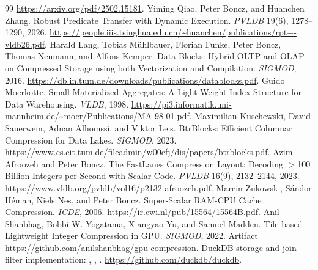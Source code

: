 \begin{thebibliography}{99}
\url{https://arxiv.org/pdf/2502.15181}.
 Yiming Qiao, Peter Boncz, and Huanchen Zhang.
Robust Predicate Transfer with Dynamic Execution.
\emph{PVLDB} 19(6), 1278--1290, 2026.
\url{https://people.iiis.tsinghua.edu.cn/~huanchen/publications/rpt+-vldb26.pdf}.
 Harald Lang, Tobias M\"uhlbauer, Florian Funke,
Peter Boncz, Thomas Neumann, and Alfons Kemper.
Data Blocks: Hybrid OLTP and OLAP on Compressed Storage using both
Vectorization and Compilation. \emph{SIGMOD}, 2016.
\url{https://db.in.tum.de/downloads/publications/datablocks.pdf}.
 Guido Moerkotte.
Small Materialized Aggregates: A Light Weight Index Structure for Data
Warehousing. \emph{VLDB}, 1998.
\url{https://pi3.informatik.uni-mannheim.de/~moer/Publications/MA-98-01.pdf}.
 Maximilian Kuschewski, David Sauerwein, Adnan Alhomssi,
and Viktor Leis. BtrBlocks: Efficient Columnar Compression for Data Lakes.
\emph{SIGMOD}, 2023.
\url{https://www.cs.cit.tum.de/fileadmin/w00cfj/dis/papers/btrblocks.pdf}.
 Azim Afroozeh and Peter Boncz.
The FastLanes Compression Layout: Decoding $>$100 Billion Integers per Second
with Scalar Code. \emph{PVLDB} 16(9), 2132--2144, 2023.
\url{https://www.vldb.org/pvldb/vol16/p2132-afroozeh.pdf}.
 Marcin Zukowski, S\'andor H\'eman, Niels Nes, and Peter Boncz.
Super-Scalar RAM-CPU Cache Compression. \emph{ICDE}, 2006.
\url{https://ir.cwi.nl/pub/15564/15564B.pdf}.
 Anil Shanbhag, Bobbi W. Yogatama, Xiangyao Yu,
and Samuel Madden. Tile-based Lightweight Integer Compression in GPU.
\emph{SIGMOD}, 2022. Artifact \url{https://github.com/anilshanbhag/gpu-compression}.
 DuckDB storage and join-filter implementation:
,
, .
\url{https://github.com/duckdb/duckdb}.
\end{thebibliography}
